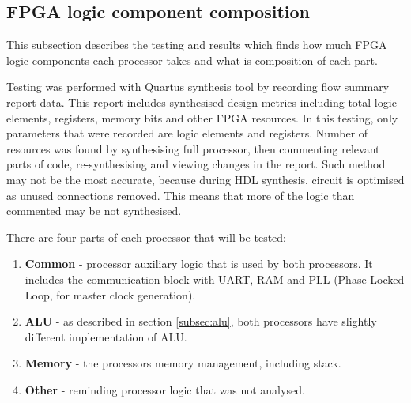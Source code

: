 \subsection{FPGA logic component composition}
This subsection describes the testing and results which finds how much FPGA logic components each processor takes and what is composition of each part.

Testing was performed with Quartus synthesis tool by recording flow summary report data. This report includes synthesised design metrics including total logic elements, registers, memory bits and other FPGA resources. In this testing, only parameters that were recorded are logic elements and registers. Number of resources was found by synthesising full processor, then commenting relevant parts of code, re-synthesising and viewing changes in the report. Such method may not be the most accurate, because during HDL synthesis, circuit is optimised as unused connections removed. This means that more of the logic than commented may be not synthesised. 

There are four parts of each processor that will be tested: 
\begin{enumerate}
	\item \textbf{Common} - processor auxiliary logic that is used by both processors. It includes the communication block with UART, RAM and PLL (Phase-Locked Loop, for master clock generation). 
	\item \textbf{ALU} - as described in section \ref{subsec:alu}, both processors have slightly different implementation of ALU.
	\item \textbf{Memory} - the processors memory management, including stack.
	\item \textbf{Other} - reminding processor logic that was not analysed.
\end{enumerate}

